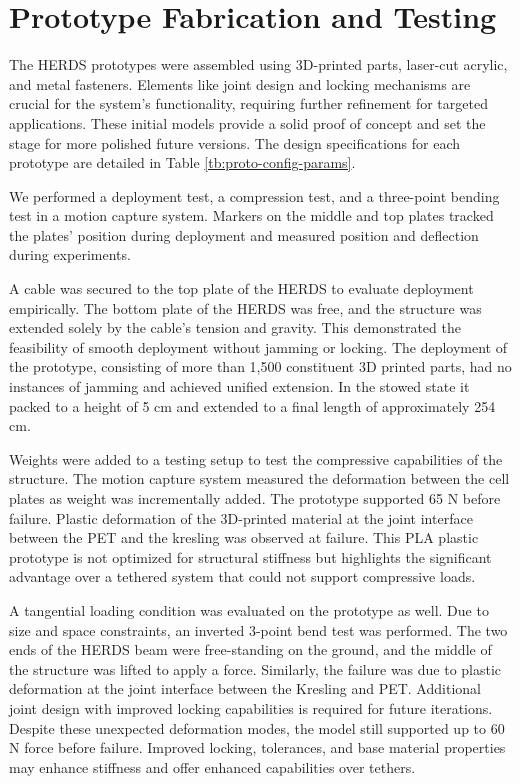 \documentclass[11pt, a4paper]{article}
\begin{document}
\section{Prototype Fabrication and Testing}
The HERDS prototypes were assembled using 3D-printed parts, laser-cut acrylic, and metal fasteners. Elements like joint design and locking mechanisms are crucial for the system’s functionality, requiring further refinement for targeted applications. These initial models provide a solid proof of concept and set the stage for more polished future versions. The design specifications for each prototype are detailed in Table \ref{tb:proto-config-params}.

We performed a deployment test, a compression test, and a three-point bending test in a motion capture system. Markers on the middle and top plates tracked the plates' position during deployment and measured position and deflection during experiments. 

A cable was secured to the top plate of the HERDS to evaluate deployment empirically. The bottom plate of the HERDS was free, and the structure was extended solely by the cable's tension and gravity. This demonstrated the feasibility of smooth deployment without jamming or locking. The deployment of the prototype, consisting of more than 1,500 constituent 3D printed parts, had no instances of jamming and achieved unified extension. In the stowed state it packed to a height of 5 cm and extended to a final length of approximately 254 cm.   

Weights were added to a testing setup to test the compressive capabilities of the structure. The motion capture system measured the deformation between the cell plates as weight was incrementally added. The prototype supported 65 N before failure. Plastic deformation of the 3D-printed material at the joint interface between the PET and the kresling was observed at failure. This PLA plastic prototype is not optimized for structural stiffness but highlights the significant advantage over a tethered system that could not support compressive loads. 

A tangential loading condition was evaluated on the prototype as well. Due to size and space constraints, an inverted 3-point bend test was performed. The two ends of the HERDS beam were free-standing on the ground, and the middle of the structure was lifted to apply a force. Similarly, the failure was due to plastic deformation at the joint interface between the Kresling and PET. Additional joint design with improved locking capabilities is required for future iterations. Despite these unexpected deformation modes, the model still supported up to 60 N force before failure. Improved locking, tolerances, and base material properties may enhance stiffness and offer enhanced capabilities over tethers. 
\end{document}
